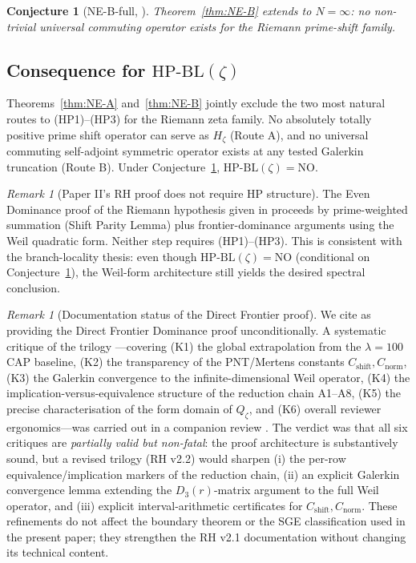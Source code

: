 \documentclass[11pt]{article}
\newtheorem{conjecture}[theorem]{Conjecture}
\theoremstyle{definition}
\theoremstyle{remark}
\newtheorem{remark}[theorem]{Remark}
\newcommand{\HBL}{\mathrm{HP\text{-}BL}}
\begin{document}
\begin{conjecture}[NE-B-full, {\cite[Conj.~\ref{thm:NE-B}-full]{Geiger2026RHII}}]\label{conj:NE-B-full}
Theorem~\ref{thm:NE-B} extends to $N = \infty$: no non-trivial
universal commuting operator exists for the Riemann prime-shift family.
\end{conjecture}

\subsection{Consequence for \texorpdfstring{$\HBL(\zeta)$}{HP-BL(zeta)}}

Theorems~\ref{thm:NE-A} and~\ref{thm:NE-B} jointly exclude the two
most natural routes to (HP1)--(HP3) for the Riemann zeta family. No
absolutely totally positive prime shift operator can serve as $H_\zeta$
(Route A), and no universal commuting self-adjoint symmetric operator
exists at any tested Galerkin truncation (Route B). Under
Conjecture~\ref{conj:NE-B-full}, $\HBL(\zeta) = \mathrm{NO}$.

\begin{remark}[Paper II's RH proof does not require HP structure]
\label{rem:riemann-without-hp}
The Even Dominance proof of the Riemann hypothesis given in
\cite{Geiger2026RHII} proceeds by prime-weighted summation (Shift
Parity Lemma) plus frontier-dominance arguments using the Weil
quadratic form. Neither step requires (HP1)--(HP3). This is
consistent with the branch-locality thesis: even though
$\HBL(\zeta) = \mathrm{NO}$ (conditional on
Conjecture~\ref{conj:NE-B-full}), the Weil-form architecture still
yields the desired spectral conclusion.
\end{remark}

\begin{remark}[Documentation status of the Direct Frontier proof]
\label{rem:riemann-critique-review}
We cite \cite{Geiger2026RHII} as providing the Direct Frontier
Dominance proof unconditionally. A systematic critique of the
trilogy \cite{Geiger2026RHII,Geiger2026RHIII}---covering (K1) the
global extrapolation from the $\lambda = 100$ CAP baseline,
(K2) the transparency of the PNT/Mertens constants
$C_{\mathrm{shift}}, C_{\mathrm{norm}}$, (K3) the Galerkin
convergence to the infinite-dimensional Weil operator,
(K4) the implication-versus-equivalence structure of the
reduction chain A1--A8, (K5) the precise characterisation of
the form domain of $Q_\zeta$, and (K6) overall reviewer
ergonomics---was carried out in a companion review
\cite{RHCritiqueReview2026}. The verdict was that all six
critiques are \emph{partially valid but non-fatal}: the proof
architecture is substantively sound, but a revised trilogy
(RH v2.2) would sharpen (i) the per-row equivalence/implication
markers of the reduction chain, (ii) an explicit Galerkin
convergence lemma extending the $D_3(r)$-matrix argument to the
full Weil operator, and (iii) explicit interval-arithmetic
certificates for $C_{\mathrm{shift}}, C_{\mathrm{norm}}$. These
refinements do not affect the boundary theorem or the SGE
classification used in the present paper; they strengthen the
RH v2.1 documentation without changing its technical content.
\end{remark}
\end{document}
